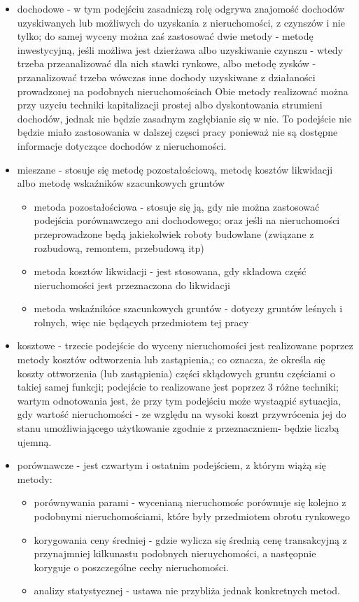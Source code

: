 \documentclass[a4paper,12pt,twoside,openany]{report}
\begin{document}
\begin{itemize}

\item dochodowe - w tym podejściu zasadniczą rolę odgrywa znajomość dochodów uzyskiwanych lub możliwych do uzyskania z nieruchomości, z czynszów i nie tylko; do samej wyceny można zaś zastosować dwie metody -  metodę inwestycyjną, jeśli możliwa jest dzierżawa albo uzyskiwanie czynszu - wtedy trzeba przeanalizować dla nich stawki rynkowe, albo metodę zysków - przanalizować trzeba wówczas inne dochody uzyskiwane z działaności prowadzonej na podobnych nieruchomościach
Obie metody realizować można przy uzyciu techniki kapitalizacji prostej albo dyskontowania strumieni dochodów, jednak nie będzie zasadnym zagłębianie się w nie. To podejście nie będzie miało zastosowania w dalszej częsci pracy ponieważ nie są dostępne informacje dotyczące dochodów z nieruchomości.



\item mieszane - stosuje się metodę pozostałościową, metodę kosztów likwidacji albo metodę wskaźników szacunkowych gruntów

\begin{itemize}
\item metoda pozostałościowa - stosuje się ją, gdy nie można zastosować podejścia porównawczego ani dochodowego; oraz jeśli na nieruchomości przeprowadzone będą jakiekolwiek roboty budowlane (związane z rozbudową, remontem, przebudową itp)
\item metoda kosztów likwidacji - jest stosowana, gdy składowa część nieruchomości jest przeznaczona do likwidacji
\item metoda wskaźnikóœ szacunkowych gruntów - dotyczy gruntów leśnych i rolnych, więc nie będących przedmiotem tej pracy
\end{itemize}

\item kosztowe - trzecie podejście do wyceny nieruchomości jest realizowane poprzez metody kosztów odtworzenia  lub zastąpienia,; co oznacza, że określa się koszty ottworzenia (lub zastąpienia)  części skłądowych gruntu częściami o takiej samej funkcji; podejście to realizowane jest poprzez 3 różne techniki; wartym odnotowania jest, że przy tym podejściu może wystaąpić sytuacjia, gdy wartość nieruchomości - ze względu na wysoki koszt przywrócenia jej do stanu umożliwiającego użytkowanie zgodnie z przeznaczniem- będzie liczbą ujemną.

\item porównawcze - jest czwartym i ostatnim podejściem, z którym wiążą się metody: 
\begin{itemize}
\item porównywania parami - wycenianą nieruchomośc porównuje się kolejno z podobnymi nieruchomościami, które były przedmiotem obrotu rynkowego
\item korygowania ceny średniej - gdzie wylicza się średnią cenę transakcyjną z przynajmniej kilkunastu podobnych nieruychomości, a nastęopnie koryguje o poszczególne cechy nieruchomości.
\item  analizy statystycznej - ustawa nie przybliża jednak konkretnych metod.
\end{itemize}



\end{itemize}
\end{document}
